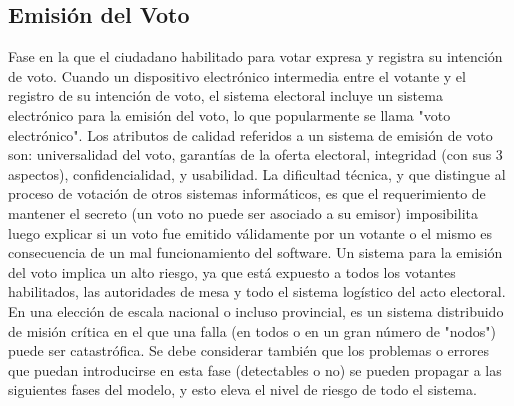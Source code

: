 \subsection{Emisión del Voto} 
Fase en la que el ciudadano habilitado para votar expresa y registra su intención de voto. Cuando un dispositivo electrónico intermedia entre el votante y el registro de su intención de voto, el sistema electoral incluye un sistema electrónico para la emisión del voto, lo que popularmente se llama "voto electrónico". Los atributos de calidad referidos a un sistema de emisión de voto son: universalidad del voto, garantías de la oferta electoral, integridad (con sus 3 aspectos), confidencialidad, y usabilidad. La dificultad técnica, y que distingue al proceso de votación de otros sistemas informáticos, es que el requerimiento de mantener el secreto (un voto no puede ser asociado a su emisor) imposibilita luego explicar si un voto fue emitido válidamente por un votante o el mismo es consecuencia de un mal funcionamiento del software. Un sistema para la emisión del voto implica un alto riesgo, ya que está expuesto a todos los votantes habilitados, las autoridades de mesa y todo el sistema logístico del acto electoral. En una elección de escala nacional o incluso provincial, es un sistema distribuido de misión crítica en el que una falla (en todos o en un gran número de "nodos") puede ser catastrófica. Se debe considerar también que los problemas o errores que puedan introducirse en esta fase (detectables o no) se pueden propagar a las siguientes fases del modelo, y esto eleva el nivel de riesgo de todo el sistema.\newline

